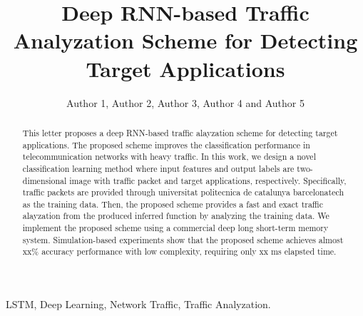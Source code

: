 \documentclass[10pt, twoside, jounal]{IEEEtran}
\begin{document}

\title{
\LARGE
Deep RNN-based Traffic Analyzation Scheme for Detecting Target Applications \\
}

\author{Author 1, Author 2, Author 3, Author 4 and Author 5}

\maketitle

% 
\begin{abstract}
This letter proposes a deep RNN-based traffic alayzation scheme for detecting target applications. The proposed scheme improves the classification performance in telecommunication networks with heavy traffic. In this work, we design a novel classification learning method where input features and output labels are two-dimensional image with traffic packet and target applications, respectively. 
Specifically, traffic packets are provided through universitat politecnica de catalunya barcelonatech as the training data\cite{Valentin2014}. 
Then, the proposed scheme provides a fast and exact traffic alayzation from the produced inferred function by analyzing the training data. We implement the proposed scheme using a commercial deep long short-term memory system. Simulation-based experiments show that the proposed scheme achieves almost xx\% accuracy performance with low complexity, requiring only xx ms elapsted time.
\end{abstract}

\begin{IEEEkeywords}
LSTM, Deep Learning, Network Traffic, Traffic Analyzation.
\end{IEEEkeywords}
\end{document}
